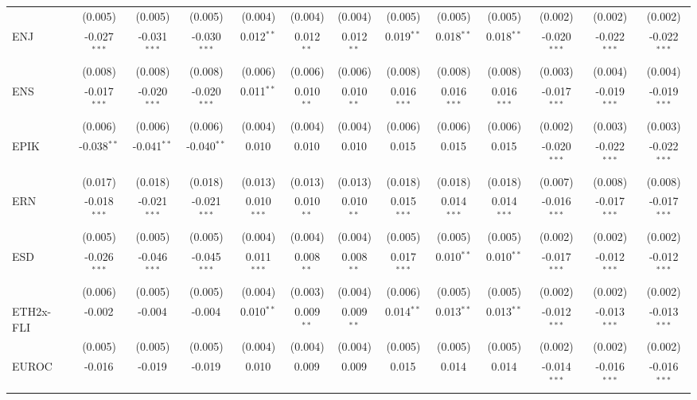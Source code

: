\begin{table}[!htbp]
\begin{tabular}{@{\extracolsep{5pt}}lcccccccccccc}
  & (0.005) & (0.005) & (0.005) & (0.004) & (0.004) & (0.004) & (0.005) & (0.005) & (0.005) & (0.002) & (0.002) & (0.002) \\
 ENJ & -0.027$^{***}$ & -0.031$^{***}$ & -0.030$^{***}$ & 0.012$^{**}$ & 0.012$^{**}$ & 0.012$^{**}$ & 0.019$^{**}$ & 0.018$^{**}$ & 0.018$^{**}$ & -0.020$^{***}$ & -0.022$^{***}$ & -0.022$^{***}$ \\
  & (0.008) & (0.008) & (0.008) & (0.006) & (0.006) & (0.006) & (0.008) & (0.008) & (0.008) & (0.003) & (0.004) & (0.004) \\
 ENS & -0.017$^{***}$ & -0.020$^{***}$ & -0.020$^{***}$ & 0.011$^{**}$ & 0.010$^{**}$ & 0.010$^{**}$ & 0.016$^{***}$ & 0.016$^{***}$ & 0.016$^{***}$ & -0.017$^{***}$ & -0.019$^{***}$ & -0.019$^{***}$ \\
  & (0.006) & (0.006) & (0.006) & (0.004) & (0.004) & (0.004) & (0.006) & (0.006) & (0.006) & (0.002) & (0.003) & (0.003) \\
 EPIK & -0.038$^{**}$ & -0.041$^{**}$ & -0.040$^{**}$ & 0.010$^{}$ & 0.010$^{}$ & 0.010$^{}$ & 0.015$^{}$ & 0.015$^{}$ & 0.015$^{}$ & -0.020$^{***}$ & -0.022$^{***}$ & -0.022$^{***}$ \\
  & (0.017) & (0.018) & (0.018) & (0.013) & (0.013) & (0.013) & (0.018) & (0.018) & (0.018) & (0.007) & (0.008) & (0.008) \\
 ERN & -0.018$^{***}$ & -0.021$^{***}$ & -0.021$^{***}$ & 0.010$^{***}$ & 0.010$^{**}$ & 0.010$^{**}$ & 0.015$^{***}$ & 0.014$^{***}$ & 0.014$^{***}$ & -0.016$^{***}$ & -0.017$^{***}$ & -0.017$^{***}$ \\
  & (0.005) & (0.005) & (0.005) & (0.004) & (0.004) & (0.004) & (0.005) & (0.005) & (0.005) & (0.002) & (0.002) & (0.002) \\
 ESD & -0.026$^{***}$ & -0.046$^{***}$ & -0.045$^{***}$ & 0.011$^{***}$ & 0.008$^{**}$ & 0.008$^{**}$ & 0.017$^{***}$ & 0.010$^{**}$ & 0.010$^{**}$ & -0.017$^{***}$ & -0.012$^{***}$ & -0.012$^{***}$ \\
  & (0.006) & (0.005) & (0.005) & (0.004) & (0.003) & (0.004) & (0.006) & (0.005) & (0.005) & (0.002) & (0.002) & (0.002) \\
 ETH2x-FLI & -0.002$^{}$ & -0.004$^{}$ & -0.004$^{}$ & 0.010$^{**}$ & 0.009$^{**}$ & 0.009$^{**}$ & 0.014$^{**}$ & 0.013$^{**}$ & 0.013$^{**}$ & -0.012$^{***}$ & -0.013$^{***}$ & -0.013$^{***}$ \\
  & (0.005) & (0.005) & (0.005) & (0.004) & (0.004) & (0.004) & (0.005) & (0.005) & (0.005) & (0.002) & (0.002) & (0.002) \\
 EUROC & -0.016$^{}$ & -0.019$^{}$ & -0.019$^{}$ & 0.010$^{}$ & 0.009$^{}$ & 0.009$^{}$ & 0.015$^{}$ & 0.014$^{}$ & 0.014$^{}$ & -0.014$^{***}$ & -0.016$^{***}$ & -0.016$^{***}$ \\

\end{tabular}
\end{table}
